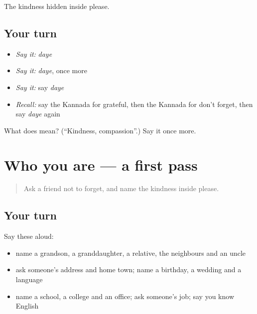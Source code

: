 \begin{grammarlens}[title={What you've built}]
The kindness hidden inside please.
\end{grammarlens}

\subsection*{Your turn}
\begin{itemize}
\raggedright
  \item \emph{Say it:} \emph{daye}
  \item \emph{Say it:} \emph{daye}, once more
  \item \emph{Say it:} say \emph{daye}
  \item \emph{Recall:} say the Kannada for grateful, then the Kannada for don't forget, then say \emph{daye} again
\end{itemize}

\begin{tcolorbox}[breakable,colback=teal!4,colframe=teal!35!black,title={Before you move on}]
What does  mean? (\textquotedblleft{}Kindness, compassion\textquotedblright{}.) Say it once more.
\end{tcolorbox}
\section[(dialogue)]{Who you are — a first pass}

\label{lesson:KA-R97-first-pass-people-work}



\begin{quote}
Ask a friend not to forget, and name the kindness inside please.
\end{quote}

\subsection*{Your turn}
Say these aloud:

\begin{itemize}
\raggedright
  \item name a grandson, a granddaughter, a relative, the neighbours and an uncle
  \item ask someone's address and home town; name a birthday, a wedding and a language
  \item name a school, a college and an office; ask someone's job; say you know English
\end{itemize}

